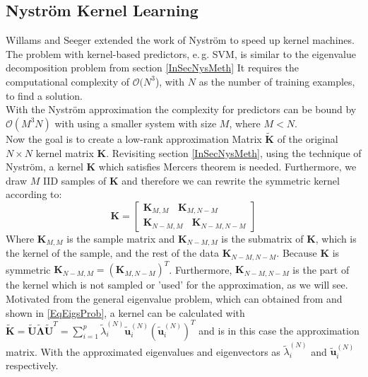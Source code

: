 \subsection{Nyström Kernel Learning}\label{InSubSecNyKerneLearning}
Willams and Seeger extended the work of Nyström to speed up kernel machines.
The problem with kernel-based predictors, e.\,g. \acs{SVM}, is similar to the eigenvalue decomposition problem from section \ref{InSecNysMeth}
It requires the computational complexity of $\mathcal{O}(N^3$), with $N$ as the number of training examples, to find a solution.\cite{Williams.2000}\\
With the Nyström approximation the complexity for predictors can be bound by $\mathcal{O}(M^3N)$ with using a smaller system with size $M$, where $M<N$.\cite{Williams.2000}\\	
Now the goal is to create a low-rank approximation Matrix $\tilde{\mathbf{K}}$ of the original $N\times N$ kernel matrix $\mathbf{K}$.
Revisiting section \ref{InSecNysMeth}, using the technique of Nyström, a kernel $\mathbf{K}$ which satisfies Mercers theorem is needed.\cite{Williams.2000}
Furthermore, we draw $M$ \acs{IID} samples of $\mathbf{K}$ and therefore we can rewrite the symmetric kernel according to:\cite{Nemtsov.2016}
\begin{equation}\label{EqNystKernelParts}
	\mathbf{K} = 
	\begin{bmatrix}
		 \mathbf{K}_{M,M}\>\>\>\> \mathbf{K}_{M,N-M} \\
		 \mathbf{K}_{N-M,M}\>\>\>\> \mathbf{K}_{N-M,N-M}
	\end{bmatrix}
\end{equation}
Where $\mathbf{K}_{M,M}$ is the sample matrix and $\mathbf{K}_{N-M,M}$ is the submatrix of $\mathbf{K}$, which is the kernel of the sample, and the rest of the data $\mathbf{K}_{N-M,N-M}$.
Because $\mathbf{K}$ is symmetric $\mathbf{K}_{N-M,M} = (\mathbf{K}_{M,N-M})^T$.
Furthermore, $\mathbf{K}_{N-M,N-M}$ is the part of the kernel which is not sampled or 'used' for the approximation, as we will see.\\
Motivated from the general eigenvalue problem, which can obtained from \cite[p. 221]{Hartmann.2015} and shown in \eqref{EqEigsProb}, a kernel can be calculated with $\tilde{\mathbf{K}} = \tilde{\mathbf{U}}\tilde{\mathbf{\Lambda}}\tilde{\mathbf{U}}^T=\sum_{i=1}^{p}\tilde{\lambda}_i^{(N)}\tilde{\mathbf{u}}_i^{(N)}(\tilde{\mathbf{u}}_i^{(N)})^T$ and is in this case the approximation matrix.\cite{Williams.2000}
With the approximated eigenvalues and eigenvectors as $\tilde{\lambda}_i^{(N)}$ and $\tilde{\mathbf{u}}_i^{(N)}$ respectively.\\
